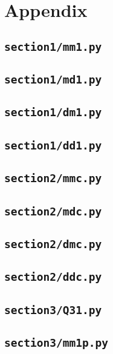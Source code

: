\documentclass{article}
\newenvironment{homeworkProblem}[1]{
	\section*{#1}
	}{
}
\newenvironment{homeworkSection}[1]{
	\subsection*{#1}
	}{
}
\begin{document}

\newpage
\begin{homeworkProblem}{Appendix}

\begin{homeworkSection}{\texttt{section1/mm1.py}}

\end{homeworkSection}

\newpage
\begin{homeworkSection}{\texttt{section1/md1.py}}

\end{homeworkSection}

\newpage
\begin{homeworkSection}{\texttt{section1/dm1.py}}

\end{homeworkSection}

\newpage
\begin{homeworkSection}{\texttt{section1/dd1.py}}

\end{homeworkSection}


\begin{homeworkSection}{\texttt{section2/mmc.py}}

\end{homeworkSection}

\newpage
\begin{homeworkSection}{\texttt{section2/mdc.py}}

\end{homeworkSection}

\newpage
\begin{homeworkSection}{\texttt{section2/dmc.py}}

\end{homeworkSection}

\newpage
\begin{homeworkSection}{\texttt{section2/ddc.py}}

\end{homeworkSection}


\newpage
\begin{homeworkSection}{\texttt{section3/Q31.py}}

\end{homeworkSection}

\newpage
\begin{homeworkSection}{\texttt{section3/mm1p.py}}

\end{homeworkSection}


\end{homeworkProblem}

\end{document}
